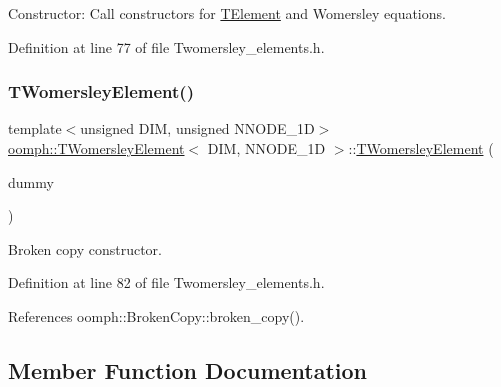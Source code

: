 Constructor\+: Call constructors for \hyperlink{classoomph_1_1TElement}{T\+Element} and Womersley equations. 



Definition at line 77 of file Twomersley\+\_\+elements.\+h.

\mbox{\label{classoomph_1_1TWomersleyElement_a341790bbd3667e91dd6a8582857ef56b}} 
\subsubsection{\texorpdfstring{T\+Womersley\+Element()}{TWomersleyElement()}\hspace{0.1cm}{\footnotesize\ttfamily [2/2]}}
{\footnotesize\ttfamily template$<$unsigned D\+IM, unsigned N\+N\+O\+D\+E\+\_\+1D$>$ \\
\hyperlink{classoomph_1_1TWomersleyElement}{oomph\+::\+T\+Womersley\+Element}$<$ D\+IM, N\+N\+O\+D\+E\+\_\+1D $>$\+::\hyperlink{classoomph_1_1TWomersleyElement}{T\+Womersley\+Element} (\begin{DoxyParamCaption}\item[{const \hyperlink{classoomph_1_1TWomersleyElement}{T\+Womersley\+Element}$<$ D\+IM, N\+N\+O\+D\+E\+\_\+1D $>$ \&}]{dummy }\end{DoxyParamCaption})\hspace{0.3cm}{\ttfamily [inline]}}



Broken copy constructor. 



Definition at line 82 of file Twomersley\+\_\+elements.\+h.



References oomph\+::\+Broken\+Copy\+::broken\+\_\+copy().



\subsection{Member Function Documentation}
\mbox{\label{classoomph_1_1TWomersleyElement_a497b00b2f011802e86fa8a0ad45546e7}} 
